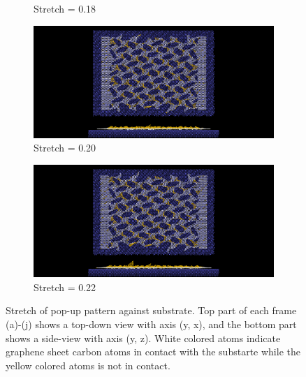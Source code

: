 \begin{figure}[H]
\begin{subfigure}[b]{0.49\textwidth}
        \caption{Stretch = 0.18}
        \label{fig:}
    \end{subfigure}
    \begin{subfigure}[b]{0.49\textwidth}
        \centering
        \includegraphics[width=\textwidth]{figures/baseline/contact_vs_stretch/popup/pop_stretch0020.png}
        \caption{Stretch = 0.20}
        \label{fig:}
    \end{subfigure}
    \begin{subfigure}[b]{0.49\textwidth}
        \centering
        \includegraphics[width=\textwidth]{figures/baseline/contact_vs_stretch/popup/pop_stretch0022.png}
        \caption{Stretch = 0.22}
        \label{fig:}
    \end{subfigure}
    \hfill
       \caption{Stretch of pop-up pattern against substrate. Top part of each frame (a)-(j) shows a top-down view with axis (y, x), and the bottom part shows a side-view with axis (y, z). White colored atoms indicate graphene sheet carbon atoms in contact with the substarte while the yellow colored atoms is not in contact.}
       \label{fig:}
  \end{figure}

